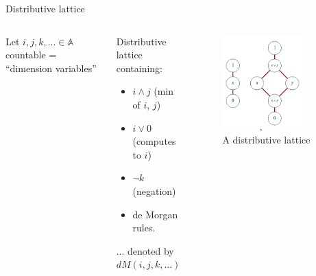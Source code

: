 \documentclass[english]{beamer}
\begin{document}
\begin{frame}{Distributive lattice}
 
%  
%  

 
 
  \begin{columns}[c]
          Let $i, j , k, ... \in \mathbb{A}$ countable = ``dimension variables'' 
 
 \begin{definition}
 Distributive lattice containing:
 
 \begin{itemize}
  \item $i \wedge j$ (min of $i$, $j$)
  \item $i \vee 0$ (computes to $i$)
  \item $\neg k$ (negation)
  \item de Morgan rules.
 
 \end{itemize}

 ... denoted by $dM(i,j,k,...)$
\end{definition}
 

        \begin{figure}
       \includegraphics[width=0.8\textwidth]{figures/lattice}
       \caption{A distributive lattice}
       \end{figure}
\end{columns}
 
 
\end{frame}
\end{document}
